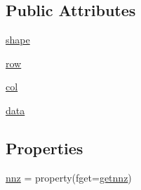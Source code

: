 \subsection*{Public Attributes}
\begin{DoxyCompactItemize}
\item 
\hyperlink{classscipy_1_1sparse_1_1coo_1_1coo__matrix_a3b15be11e1944e48068f0f2a738f78b6}{shape}
\item 
\hyperlink{classscipy_1_1sparse_1_1coo_1_1coo__matrix_a0ebcdc00d47ce3b159221c56962bd85c}{row}
\item 
\hyperlink{classscipy_1_1sparse_1_1coo_1_1coo__matrix_a02e3f97e514df0a4e9ee40efb5703e25}{col}
\item 
\hyperlink{classscipy_1_1sparse_1_1coo_1_1coo__matrix_a4b744396536cbd2f6200ceb55963021e}{data}
\end{DoxyCompactItemize}
\subsection*{Properties}
\begin{DoxyCompactItemize}
\item 
\hyperlink{classscipy_1_1sparse_1_1coo_1_1coo__matrix_aace3cd7c791be094a00dd37cf3620124}{nnz} = property(fget=\hyperlink{classscipy_1_1sparse_1_1coo_1_1coo__matrix_a535d63de8a28128cee9840a472ab59b5}{getnnz})
\end{DoxyCompactItemize}


